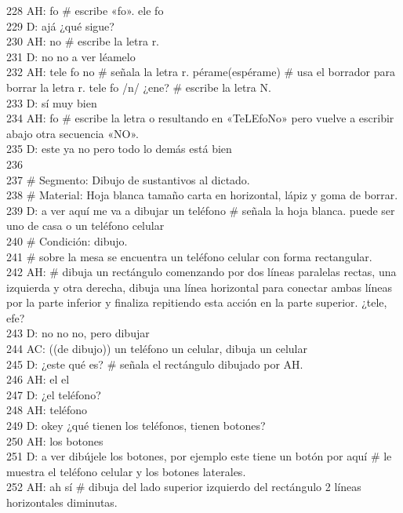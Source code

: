 228 AH: fo \# escribe «fo». ele fo\\
229 D: ajá ¿qué sigue?\\
230 AH: no \# escribe la letra r.\\
231 D: no no a ver léamelo\\
232 AH: tele fo no \# señala la letra r. pérame(espérame) \# usa el borrador para borrar la letra r. tele fo /n/ ¿ene? \# escribe la letra N.\\
233 D: sí muy bien\\
234 AH: fo \# escribe la letra o resultando en «TeLEfoNo» pero vuelve a escribir abajo otra secuencia «NO».\\
235 D: este ya no pero todo lo demás está bien\\
236 \\
237 \# Segmento: Dibujo de sustantivos al dictado.\\
238 \# Material: Hoja blanca tamaño carta en horizontal, lápiz y goma de borrar.\\
239 D: a ver aquí me va a dibujar un teléfono \# señala la hoja blanca. puede ser uno de casa o un teléfono celular\\
240 \# Condición: dibujo.\\
241 \# sobre la mesa se encuentra un teléfono celular con forma rectangular.\\
242 AH: \# dibuja un rectángulo comenzando por dos líneas paralelas rectas, una izquierda y otra derecha, dibuja una línea horizontal para conectar ambas líneas por la parte inferior y finaliza repitiendo esta acción en la parte superior. ¿tele, efe?\\
243 D: no no no, pero dibujar\\
244 AC: ((de dibujo)) un teléfono un celular, dibuja un celular\\
245 D: ¿este qué es? \# señala el rectángulo dibujado por AH.\\
246 AH: el el\\
247 D: ¿el teléfono?\\
248 AH: teléfono\\
249 D: okey ¿qué tienen los teléfonos, tienen botones?\\
250 AH: los botones\\
251 D: a ver dibújele los botones, por ejemplo este tiene un botón por aquí \# le muestra el teléfono celular y los botones laterales.\\
252 AH: ah sí \# dibuja del lado superior izquierdo del rectángulo 2 líneas horizontales diminutas.\\
